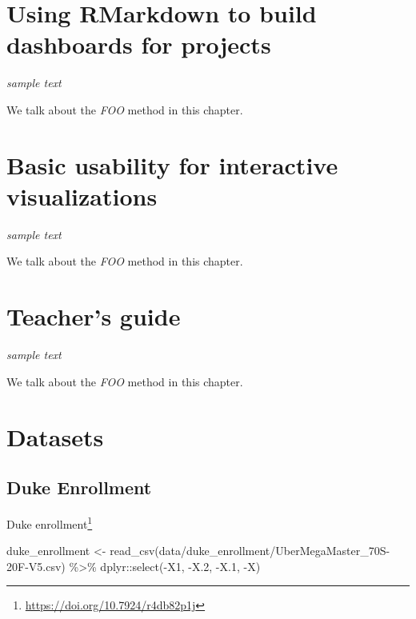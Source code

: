 \documentclass[
]{krantz}
\makeatletter
\newenvironment{Shaded}{\begin{snugshade}}{\end{snugshade}}
\newcommand{\FloatTok}[1]{\textcolor[rgb]{0.06,0.06,0.06}{#1}}
\newcommand{\FunctionTok}[1]{\textcolor[rgb]{0,0,0}{#1}}
\newcommand{\NormalTok}[1]{#1}
\newcommand{\OtherTok}[1]{\textcolor[rgb]{0.37,0.37,0.37}{#1}}
\newcommand{\SpecialCharTok}[1]{\textcolor[rgb]{0,0,0}{#1}}
\newcommand{\StringTok}[1]{\textcolor[rgb]{0.5,0.5,0.5}{#1}}
\renewcommand{\href}[2]{#2\footnote{\url{#1}}}
\newenvironment{kframe}{%
\medskip{}
\setlength{\fboxsep}{.8em}
 \def\at@end@of@kframe{}%
 \ifinner\ifhmode%
  \def\at@end@of@kframe{\end{minipage}}%
  \begin{minipage}{\columnwidth}%
 \fi\fi%
 \def\FrameCommand##1{\hskip\@totalleftmargin \hskip-\fboxsep
 \colorbox{shadecolor}{##1}\hskip-\fboxsep
     \hskip-\linewidth \hskip-\@totalleftmargin \hskip\columnwidth}%
 \MakeFramed {\advance\hsize-\width
   \@totalleftmargin\z@ \linewidth\hsize
   \@setminipage}}%
 {\par\unskip\endMakeFramed%
 \at@end@of@kframe}
\renewenvironment{Shaded}{\begin{kframe}}{\end{kframe}}
\makeatother
\begin{document}
\hypertarget{rmarkdown-dashboards}{%
\chapter{Using RMarkdown to build dashboards for projects}\label{rmarkdown-dashboards}}

\emph{sample text}

We talk about the \emph{FOO} method in this chapter.

\hypertarget{usability-for-visualizations}{%
\chapter{Basic usability for interactive visualizations}\label{usability-for-visualizations}}

\emph{sample text}

We talk about the \emph{FOO} method in this chapter.

\hypertarget{teachers-guide}{%
\chapter{Teacher's guide}\label{teachers-guide}}

\emph{sample text}

We talk about the \emph{FOO} method in this chapter.

\cleardoublepage

\hypertarget{appendix-appendix}{%
\appendix {}}


\hypertarget{datasets}{%
\chapter{Datasets}\label{datasets}}

\hypertarget{duke-enrollment}{%
\section*{Duke Enrollment}\label{duke-enrollment}}


\href{https://doi.org/10.7924/r4db82p1j}{Duke enrollment}

\begin{Shaded}
\begin{Highlighting}[]
\NormalTok{duke\_enrollment }\OtherTok{\textless{}{-}} \FunctionTok{read\_csv}\NormalTok{(}\StringTok{\textquotesingle{}data/duke\_enrollment/UberMegaMaster\_70S{-}20F{-}V5.csv\textquotesingle{}}\NormalTok{) }\SpecialCharTok{\%\textgreater{}\%}
\NormalTok{  dplyr}\SpecialCharTok{::}\FunctionTok{select}\NormalTok{(}\SpecialCharTok{{-}}\NormalTok{X1, }\SpecialCharTok{{-}}\NormalTok{X}\FloatTok{.2}\NormalTok{, }\SpecialCharTok{{-}}\NormalTok{X}\FloatTok{.1}\NormalTok{, }\SpecialCharTok{{-}}\NormalTok{X)}
\end{Highlighting}
\end{Shaded}
\end{document}
